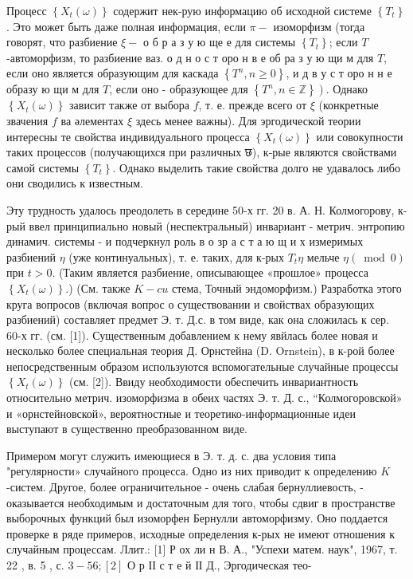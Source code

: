 \documentclass[10pt]{article}
\begin{document}
Процесс $\left\{X_{t}(\omega)\right\}$ содержит нек-рую информацию об исходной системе $\left\{T_{t}\right\}$. Это может быть даже полная информация, если $\pi-$ изоморфизм (тогда говорят, что разбиение $\xi-$ о б р а з у ю ще е для системы $\left\{T_{t}\right\}$; если $T$-автоморфизм, то разбиение ваз. о д н о с т оро н в е об ра з у ю щи м для $T$, если оно является образующим для каскада $\left\{T^{n}, n \geqslant 0\right\}$, и д в у с т оро н н е образу ю щи м для $T$, если оно - образующее для $\left.\left\{T^{n}, n \in \mathbb{Z}\right\}\right)$. Однако $\left\{X_{t}(\omega)\right\}$ зависит также от выбора $f$, т. е. прежде всего от $\xi$ (конкретные звачения $f$ ва әлементах $\xi$ здесь менее важны). Для эргодической теории интересны те свойства индивидуального процесса $\left\{X_{t}(\omega)\right\}$ или совокупности таких процессов (получающихся при различных छ), к-рые являются свойствами самой системы $\left\{T_{t}\right\}$. Однако выделить такие свойства долго не удавалось либо они сводились к известным.



Эту трудность удалось преодолеть в середине 50-х гг. 20 в. А. Н. Колмогорову, к-рый ввел принципиально новый (неспектральный) инвариант - метрич. энтропию динамич. системы - и подчеркнул роль в о зр а с т а ю щ и х измеримых разбиений $\eta$ (уже континуальных), т. е. таких, для к-рых $T_{t} \eta$ мельче $\eta(\bmod 0)$ при $t>0$. (Таким является разбиение, описывающее «прошлое» процесса $\left\{X_{t}(\omega)\right\}$.) (См. также $K-c u$ стема, Точный эндоморфизм.) Разработка этого круга вопросов (включая вопрос о существовании и свойствах образующих разбиений) составляет предмет Э. т. Д.с. в том виде, как она сложилась к сер. 60-х гг. (см. [1]). Существенным добавлением к нему явйлась более новая и несколько более специальная теория Д. Орнстейна (D. Ornstein), в к-рой более непосредственным образом используются вспомогательные случайные процессы $\left\{X_{t}(\omega)\right\}$ (см. [2]). Ввиду необходимости обеспечить инвариантность относительно метрич. изоморфизма в обеих частях Э. т. Д. с., “Колмогоровской» и «орнстейновской», вероятностные и теоретико-информационные идеи выступают в существенно преобразованном виде.



Примером могут служить имеющиеся в Э. т. д. с. два условия типа "регулярности» случайного процесса. Одно из них приводит к определению $K$-систем. Другое, более ограничительное - очень слабая бернуллиевость, - оказывается необходимым и достаточным для того, чтобы сдвиг в пространстве выборочных функций был изоморфен Бернулли автоморфизму. Оно поддается проверке в ряде примеров, исходные определения к-рых не имеют отношения к случайным процессам. Ллит.: [1] Р ох ли н В. А., "Успехи матем. наук", 1967, т. 22 , в. 5 , с. $3-56 ;[2]$ О р ІІ с т е й ІІ Д., Эргодическая тео-
\end{document}
